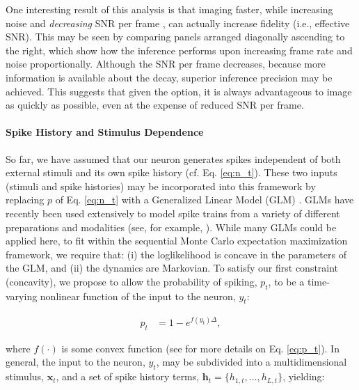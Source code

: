 \documentclass[10pt]{article}
\providecommand{\ve}[1]{\boldsymbol{#1}}
\providecommand{\ve}[1]{\boldsymbol{#1}}
\begin{document}
One interesting result of this analysis is that imaging faster, while increasing noise and \emph{decreasing} SNR per frame \cite{SjulsonMiesenbock07}, can actually increase fidelity (i.e., effective SNR).  This may be seen by comparing panels arranged diagonally ascending to the right, which show how the inference performs upon increasing frame rate and noise proportionally.  Although the SNR per frame decreases, because more information is available about the decay, superior inference precision may be achieved. This suggests that given the option, it is always advantageous to image as quickly as possible, even at the expense of reduced SNR per frame.

\paragraph{Spike History and Stimulus Dependence}

So far, we have assumed that our neuron generates spikes independent of both external stimuli and its own spike history (cf. Eq. \ref{eq:n_t}). These two inputs (stimuli and spike histories) may be incorporated into this framework by replacing $p$ of Eq. \ref{eq:n_t} with a Generalized Linear Model (GLM) \cite{McCullaghNelder89}.  GLMs have recently been used extensively to model spike trains from a variety of different preparations and modalities (see, for example,  \cite{PaninskiLewi07}). While many GLMs could be applied here, to fit within the sequential Monte Carlo expectation maximization framework, we require that: (i) the loglikelihood is concave in the parameters of the GLM, and (ii) the dynamics are Markovian.  To satisfy our first constraint (concavity), we propose to allow the probability of spiking, $p_t$, to be a time-varying nonlinear function of the input to the neuron, $y_t$:

\begin{align} \label{eq:p_t}
p_t &= 1 - e^{f(y_t) \Delta},
\end{align}


\noindent where $f(\cdot)$ is some convex function (see \cite{EscolaPaninski07} for more details on Eq. \ref{eq:p_t}).  In general, the input to the neuron, $y_t$, may be subdivided into a multidimensional stimulus, $\ve{x}_t$, and a set of spike history terms, $\ve{h}_t=\{h_{1,t}, \ldots, h_{L,t}\}$, yielding:
\end{document}
